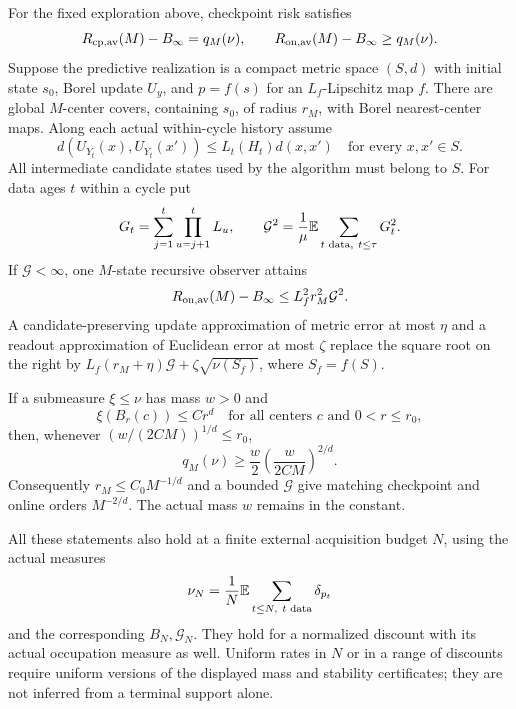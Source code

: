 \begin{theorem}\label{thm:geometry}
For the fixed exploration above, checkpoint risk satisfies
\begin{equation}\label{eq:cp}
 R_{\mathrm{cp},\mathrm{av}}(M)-B_\infty=q_M(\nu),\qquad
 R_{\mathrm{on},\mathrm{av}}(M)-B_\infty\ge q_M(\nu).
\end{equation}
Suppose the predictive realization is a compact metric space $(S,d)$ with initial state $s_0$, Borel update $U_y$, and $p=f(s)$ for an $L_f$-Lipschitz map $f$. There are global $M$-center covers, containing $s_0$, of radius $r_M$, with Borel nearest-center maps. Along each actual within-cycle history assume
\begin{equation}\label{eq:stability}
 d(U_{Y_t}(x),U_{Y_t}(x'))\le L_t(H_t)d(x,x')
 \quad\text{for every }x,x'\in S.
\end{equation}
All intermediate candidate states used by the algorithm must belong to $S$. For data ages $t$ within a cycle put
\[
 G_t=\sum_{j=1}^t\prod_{u=j+1}^tL_u,\qquad
 \mathcal G^2=\frac1\mu\mathbb E\sum_{t\text{ data},\ t\le\tau}G_t^2.
\]
If $\mathcal G<\infty$, one $M$-state recursive observer attains
\begin{equation}\label{eq:geom-upper}
 R_{\mathrm{on},\mathrm{av}}(M)-B_\infty
 \le L_f^2r_M^2\mathcal G^2.
\end{equation}
A candidate-preserving update approximation of metric error at most $\eta$ and a readout approximation of Euclidean error at most $\zeta$ replace the square root on the right by
$L_f(r_M+\eta)\mathcal G+\zeta\sqrt{\nu(S_f)}$, where $S_f=f(S)$.

If a submeasure $\xi\le\nu$ has mass $w>0$ and
\begin{equation}\label{eq:smallball}
 \xi(B_r(c))\le C r^d
 \quad\text{for all centers }c\text{ and }0<r\le r_0,
\end{equation}
then, whenever $(w/(2CM))^{1/d}\le r_0$,
\begin{equation}\label{eq:masslower}
 q_M(\nu)\ge\frac w2\left(\frac{w}{2CM}\right)^{2/d}.
\end{equation}
Consequently $r_M\le C_0M^{-1/d}$ and a bounded $\mathcal G$ give matching checkpoint and online orders $M^{-2/d}$. The actual mass $w$ remains in the constant.

All these statements also hold at a finite external acquisition budget $N$, using the actual measures
\[
 \nu_N=\frac1N\mathbb E\sum_{t\le N,\ t\text{ data}}\delta_{p_t}
\]
and the corresponding $B_N,\mathcal G_N$. They hold for a normalized discount with its actual occupation measure as well. Uniform rates in $N$ or in a range of discounts require uniform versions of the displayed mass and stability certificates; they are not inferred from a terminal support alone.
\end{theorem}
